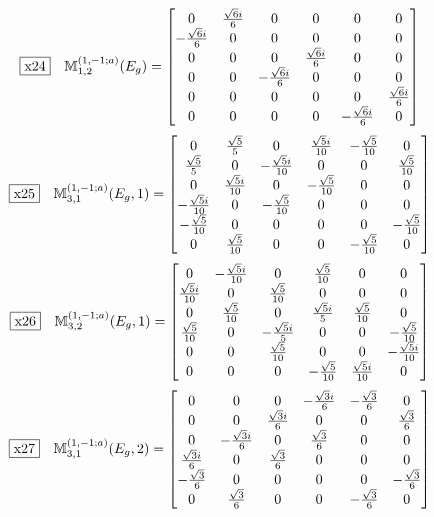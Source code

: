 \documentclass[fleqn,10pt,landscape]{jsarticle}
\begin{document}
\begin{dmath*}
\fbox{x24}\quad \mathbb{M}_{1,2}^{(1,-1;a)}(E_{g})=\begin{bmatrix} 0 & \frac{\sqrt{6} i}{6} & 0 & 0 & 0 & 0 \\ - \frac{\sqrt{6} i}{6} & 0 & 0 & 0 & 0 & 0 \\ 0 & 0 & 0 & \frac{\sqrt{6} i}{6} & 0 & 0 \\ 0 & 0 & - \frac{\sqrt{6} i}{6} & 0 & 0 & 0 \\ 0 & 0 & 0 & 0 & 0 & \frac{\sqrt{6} i}{6} \\ 0 & 0 & 0 & 0 & - \frac{\sqrt{6} i}{6} & 0 \end{bmatrix}
\end{dmath*}
\begin{dmath*}
\fbox{x25}\quad \mathbb{M}_{3,1}^{(1,-1;a)}(E_{g},1)=\begin{bmatrix} 0 & \frac{\sqrt{5}}{5} & 0 & \frac{\sqrt{5} i}{10} & - \frac{\sqrt{5}}{10} & 0 \\ \frac{\sqrt{5}}{5} & 0 & - \frac{\sqrt{5} i}{10} & 0 & 0 & \frac{\sqrt{5}}{10} \\ 0 & \frac{\sqrt{5} i}{10} & 0 & - \frac{\sqrt{5}}{10} & 0 & 0 \\ - \frac{\sqrt{5} i}{10} & 0 & - \frac{\sqrt{5}}{10} & 0 & 0 & 0 \\ - \frac{\sqrt{5}}{10} & 0 & 0 & 0 & 0 & - \frac{\sqrt{5}}{10} \\ 0 & \frac{\sqrt{5}}{10} & 0 & 0 & - \frac{\sqrt{5}}{10} & 0 \end{bmatrix}
\end{dmath*}
\begin{dmath*}
\fbox{x26}\quad \mathbb{M}_{3,2}^{(1,-1;a)}(E_{g},1)=\begin{bmatrix} 0 & - \frac{\sqrt{5} i}{10} & 0 & \frac{\sqrt{5}}{10} & 0 & 0 \\ \frac{\sqrt{5} i}{10} & 0 & \frac{\sqrt{5}}{10} & 0 & 0 & 0 \\ 0 & \frac{\sqrt{5}}{10} & 0 & \frac{\sqrt{5} i}{5} & \frac{\sqrt{5}}{10} & 0 \\ \frac{\sqrt{5}}{10} & 0 & - \frac{\sqrt{5} i}{5} & 0 & 0 & - \frac{\sqrt{5}}{10} \\ 0 & 0 & \frac{\sqrt{5}}{10} & 0 & 0 & - \frac{\sqrt{5} i}{10} \\ 0 & 0 & 0 & - \frac{\sqrt{5}}{10} & \frac{\sqrt{5} i}{10} & 0 \end{bmatrix}
\end{dmath*}
\begin{dmath*}
\fbox{x27}\quad \mathbb{M}_{3,1}^{(1,-1;a)}(E_{g},2)=\begin{bmatrix} 0 & 0 & 0 & - \frac{\sqrt{3} i}{6} & - \frac{\sqrt{3}}{6} & 0 \\ 0 & 0 & \frac{\sqrt{3} i}{6} & 0 & 0 & \frac{\sqrt{3}}{6} \\ 0 & - \frac{\sqrt{3} i}{6} & 0 & \frac{\sqrt{3}}{6} & 0 & 0 \\ \frac{\sqrt{3} i}{6} & 0 & \frac{\sqrt{3}}{6} & 0 & 0 & 0 \\ - \frac{\sqrt{3}}{6} & 0 & 0 & 0 & 0 & - \frac{\sqrt{3}}{6} \\ 0 & \frac{\sqrt{3}}{6} & 0 & 0 & - \frac{\sqrt{3}}{6} & 0 \end{bmatrix}
\end{dmath*}
\end{document}
